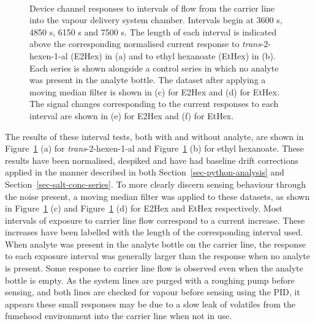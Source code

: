 \documentclass[
  a4paper,
]{scrbook}
\begin{document}
\begin{figure}
\begin{minipage}[t]{0.45\linewidth}
{{}

}

\end{minipage}%
%
\begin{minipage}[t]{0.01\linewidth}

{\centering 

~

}

\end{minipage}%

\caption[Device channel responses to intervals of
\emph{trans}-2-hexen-1-al (E2Hex) or ethyl hexanoate (EtHex) flow from
the carrier line into the vapour delivery system chamber, with and
without filtering, and compared with a control series where no analyte
was present in the analyte bottle.]{\label{fig-EtHex-sampling}Device
channel responses to intervals of flow from the carrier line into the
vapour delivery system chamber. Intervals begin at 3600 s, 4850 s, 6150
s and 7500 s. The length of each interval is indicated above the
corresponding normalised current response to \emph{trans}-2-hexen-1-al
(E2Hex) in (a) and to ethyl hexanoate (EtHex) in (b). Each series is
shown alongside a control series in which no analyte was present in the
analyte bottle. The dataset after applying a moving median filter is
shown in (c) for E2Hex and (d) for EtHex. The signal changes
corresponding to the current responses to each interval are shown in (e)
for E2Hex and (f) for EtHex.}

\end{figure}

The results of these interval tests, both with and without analyte, are
shown in Figure~\ref{fig-EtHex-sampling} (a) for
\emph{trans}-2-hexen-1-al and Figure~\ref{fig-EtHex-sampling} (b) for
ethyl hexanoate. These results have been normalised, despiked and have
had baseline drift corrections applied in the manner described in both
Section~\ref{sec-python-analysis} and
Section~\ref{sec-salt-conc-series}. To more clearly discern sensing
behaviour through the noise present, a moving median filter was applied
to these datasets, as shown in Figure~\ref{fig-EtHex-sampling} (c) and
Figure~\ref{fig-EtHex-sampling} (d) for E2Hex and EtHex respectively.
Most intervals of exposure to carrier line flow correspond to a current
increase. These increases have been labelled with the length of the
corresponding interval used. When analyte was present in the analyte
bottle on the carrier line, the response to each exposure interval was
generally larger than the response when no analyte is present. Some
response to carrier line flow is observed even when the analyte bottle
is empty. As the system lines are purged with a roughing pump before
sensing, and both lines are checked for vapour before sensing using the
PID, it appears these small responses may be due to a slow leak of
volatiles from the fumehood environment into the carrier line when not
in use.
\end{document}
